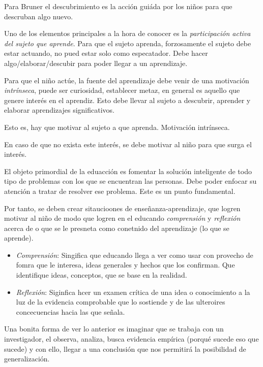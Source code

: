 \documentclass[12pt]{report}
\theoremstyle{largebreak}
\begin{document}
\begin{enumerate}
        Para Bruner el descubrimiento es la acción guiáda por los niños para que descruban algo nuevo.

        Uno de los elementos principales a la hora de conocer es la \textit{participación activa del sujeto que aprende}. Para que el sujeto aprenda, forzosamente el sujeto debe estar actuando, no pued estar solo como especatador. Debe hacer algo/elaborar/descubir para poder llegar a un aprendizaje.

        Para que el niño actúe, la fuente del aprendizaje debe venir de una motivación \textit{intrínseca}, puede ser curiosidad, establecer metaz, en general es aquello que genere interés en el aprendiz. Esto debe llevar al sujeto a descubrir, aprender y elaborar aprendizajes significativos.

        Esto es, hay que motivar al sujeto a que aprenda. Motivación intrínseca.

        En caso de que no exista este interés, se debe motivar al niño para que surga el interés.

        El objeto primordial de la eduacción es fomentar la solución inteligente de todo tipo de problemas con los que se encuentran las personas. Debe poder enfocar su atención a tratar de resolver ese problema. Este es un punto fundamental.

        Por tanto, se deben crear sitaucioones de enseñanza-aprendizaje, que logren motivar al niño de modo que logren en el educando \textit{comprensión} y \textit{reflexión} acerca de o que se le presneta como conetnido del aprendizaje (lo que se aprende).

        \begin{itemize}
            \item \textit{Comprensión}: Singifica que educando llega a ver como usar con provecho de fomra que le interesa, ideas generales y hechos que los confirman. Que identifique ideas, conceptos, que se base en la realidad.
            \item \textit{Reflexión}: Siginfica hcer un examen crítica de una idea o conocimiento a la luz de la evidencia comprobable que lo sostiende y de las ulteroires concecuencias hacia las que señala.
        \end{itemize}
        Una bonita forma de ver lo anterior es imaginar que se trabaja con un investigador, el observa, analiza, busca evidencia empírica (porqué sucede eso que sucede) y con ello, llegar a una conclusión que nos permitirá la posibilidad de generalización.
    \end{enumerate}
\end{document}
